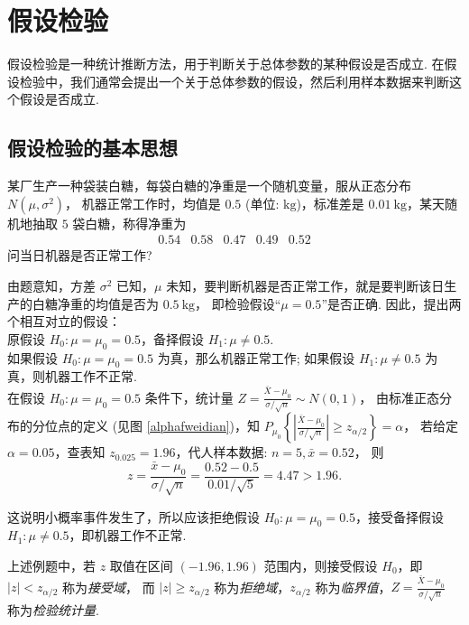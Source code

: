 \section{假设检验}

假设检验是一种统计推断方法，用于判断关于总体参数的某种假设是否成立. 在假设检验中，我们通常会提出一个关于总体参数的假设，然后利用样本数据来判断这个假设是否成立. 

\subsection{假设检验的基本思想}

\begin{example}
    某厂生产一种袋装白糖，每袋白糖的净重是一个随机变量，服从正态分布 $ N\left(\mu, \sigma^{2}\right)$，\label{baitjq}
    机器正常工作时，均值是 $0.5$ (单位: $ \mathrm{kg}$)，标准差是 $ 0.01 \mathrm{~kg}$，某天随机地抽取 $5$ 袋白糖，称得净重为
    $$\begin{array}{lllll}
            0.54 & 0.58 & 0.47 & 0.49 & 0.52
        \end{array}$$
    问当日机器是否正常工作?
\end{example}
\begin{solution}
    由题意知，方差 $ \sigma^{2} $ 已知，$\mu $ 未知，要判断机器是否正常工作，就是要判断该日生产的白糖净重的均值是否为 $ 0.5 \mathrm{~kg} $，
    即检验假设“$\mu=0.5$”是否正确. 因此，提出两个相互对立的假设：\\
    原假设 $ H_{0}: \mu=\mu_{0}=0.5 $，备择假设 $ H_{1}: \mu \neq 0.5 .$\\
    如果假设 $ H_{0}: \mu=\mu_{0}=0.5 $ 为真，那么机器正常工作; 如果假设 $ H_{1}: \mu \neq 0.5 $ 为真，则机器工作不正常.\\
    在假设 $ H_{0}: \mu=\mu_{0}=0.5 $ 条件下，统计量 $\displaystyle Z=\frac{\bar{X}-\mu_{0}}{\sigma / \sqrt{n}} \sim N(0,1) $，
    由标准正态分布的分位点的定义 (见图 \ref{alphafweidian})，知 $ P_{\mu_{0}}\left\{\left|\frac{\bar{X}-\mu_{0}}{\sigma / \sqrt{n}}\right| \geqslant z_{\alpha / 2}\right\}=\alpha $，
    若给定 $ \alpha=0.05$，查表知 $ z_{0.025}=1.96$，代人样本数据: $ n=5, \bar{x}=0.52 $，
    则 $$\displaystyle z=\frac{\bar{x}-\mu_{0}}{\sigma / \sqrt{n}}=\frac{0.52-0.5}{0.01 / \sqrt{5}}=4.47>1.96 .$$

    这说明小概率事件发生了，所以应该拒绝假设 $ H_{0}: \mu=\mu_{0}=0.5 $，接受备择假设 $ H_{1}: \mu \neq 0.5 $，即机器工作不正常.
\end{solution}

\begin{definition}[接收域和拒绝域]
    上述例题中，若 $ z $ 取值在区间 $ (-1.96,1.96) $ 范围内，则接受假设 $ H_{0} $，即 $ |z|<z_{\alpha / 2} $ 称为\textit{接受域}，
    而 $ |z| \geqslant z_{\alpha / 2} $ 称为\textit{拒绝域}，$z_{\alpha / 2} $ 称为\textit{临界值}，$\displaystyle Z=\frac{\bar{X}-\mu_{0}}{\sigma / \sqrt{n}} $ 称为\textit{检验统计量}.
\end{definition}

